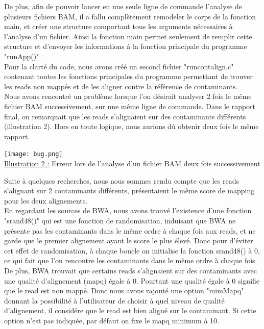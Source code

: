 \documentclass[a4paper,12pt]{article}
\begin{document}
De plus, afin de pouvoir lancer en une seule ligne de commande l'analyse de plusieurs fichiers BAM, il a fallu complètement remodeler le corps de la fonction main, et créer une structure comportant tous les arguments nécessaires à l'analyse d'un fichier. Ainsi la fonction main permet seulement de remplir cette structure et d'envoyer les informations à la fonction principale du programme "runApp()". \\Pour la clarté du code, nous avons créé un second fichier "runcontalign.c" contenant toutes les fonctions principales du programme permettant de trouver les reads non mappés et de les aligner contre la référence de contaminants. \\
\clearpage
Nous avons rencontré un problème lorsque l'on désirait analyser 2 fois le même fichier BAM successivement, sur une même ligne de commande. Dans le rapport final, on remarquait que les reads s'alignaient sur des contaminants différents (illustration 2). Hors en toute logique, nous aurions dû obtenir deux fois le même rapport.
\begin{center}
 \texttt{[image: bug.png]}~\\
 \underline{Illustration 2 :} Erreur lors de l'analyse d'un fichier BAM deux fois successivement
 \end{center}
Suite à quelques recherches, nous nous sommes rendu compte que les reads s'alignant sur 2 contaminants différents, présentaient le même score de mapping pour les deux alignements.\\
En regardant les sources de BWA, nous avons trouvé l'existence d'une fonction "srand48()" qui est une fonction de randomisation,  induisant que BWA ne présente pas les contaminants dans le même ordre à chaque fois aux reads, et ne garde que le premier alignement ayant le score le plus élevé. Donc pour d'éviter cet effet de randomisation, à chaque boucle on initialise la fonction srand48() à 0, ce qui fait que l'on rencontre les contaminants dans le même ordre à chaque fois. \\


De plus, BWA trouvait que certains reads s'alignaient sur des contaminants avec une qualité d'alignement (mapq) égale à 0. Pourtant une qualité égale à 0 signifie que le read est non mappé. Donc nous avons rajouté une option "mimMapq" donnant la possibilité à l'utilisateur de choisir à quel niveau de qualité d'alignement, il considére que le read est bien aligné sur le contaminant. Si cette option n'est pas indiquée, par défaut on fixe le mapq minimum à 10.
 
\end{document}

